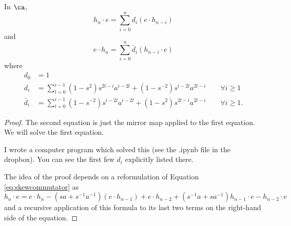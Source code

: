 \begin{proposition} \label{prop:hncommutator}
In $\ca$, 
\[
h_n \cdot e = \sum_{i=0}^n d_i (e \cdot h_{n-i})
\]
and
\[
e \cdot h_n = \sum_{i=0}^n \bar{d}_i (h_{n-i} \cdot e)
\]
where
\begin{align*}
d_0 & = 1 \\
d_i & = \sum_{l=0}^{i-1} (1 - s^2) s^{2l-i} a^{i-2l} + (1 - s^{-2}) s^{i-2l} a^{2l-i} \qquad \forall i \geq 1 \\
\bar{d}_i & = \sum_{l=0}^{i-1} (1 - s^{-2}) s^{i-2l} a^{i-2l} + (1 - s^{2}) s^{2l-i} a^{2l-i} \qquad \forall i \geq 1.
\end{align*}
\end{proposition}
\begin{proof}
The second equation is just the mirror map applied to the first equation. We will solve the first equation. 

I wrote a computer program which solved this (see the .ipynb file in the dropbox). You can see the first few $d_i$ explicitly listed there. 

The idea of the proof depends on a reformulation of Equation \eqref{eq:skewcommutator} as
\[
h_n \cdot e = e \cdot h_n - ( s a + s^{-1} a^{-1} ) ( e \cdot h_{n-1} ) + e \cdot h_{n-2} + ( s^{-1} a + s a^{-1} ) h_{n-1} \cdot e - h_{n-2} \cdot e
\]
and a recursive application of this formula to its last two terms on the right-hand side of the equation. 


\end{proof}
